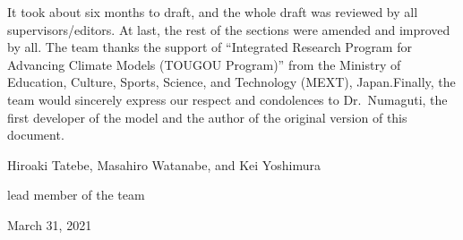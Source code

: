 It took about six months to draft, and the whole draft was reviewed by
all supervisors/editors. At last, the rest of the sections were amended
and improved by all. The team thanks the support of ``Integrated
Research Program for Advancing Climate Models (TOUGOU Program)'' from
the Ministry of Education, Culture, Sports, Science, and Technology
(MEXT), Japan.Finally, the team would sincerely express our respect and
condolences to Dr.~Numaguti, the first developer of the model and the
author of the original version of this document.

Hiroaki Tatebe, Masahiro Watanabe, and Kei Yoshimura

lead member of the team

March 31, 2021
